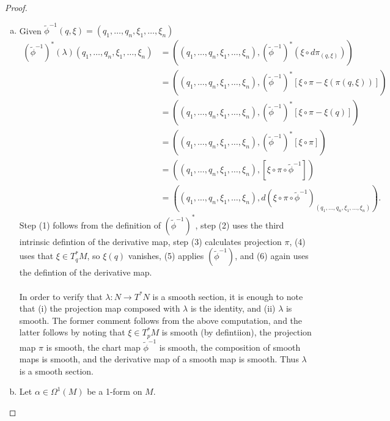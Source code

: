 \documentclass{article}
\begin{document}
\begin{proof} \text{}\\
  \begin{enumerate}[(a)]
    \item Given $\tilde{\phi}^{-1}(q, \xi) = (q_1, \hdots, q_n, \xi_1, \hdots, \xi_n)$
    \begin{align}
      (\tilde{\phi}^{-1})^*(\lambda)(q_1, \hdots, q_n, \xi_1, \hdots, \xi_n)
      &= ((q_1, \hdots, q_n, \xi_1, \hdots, \xi_n), (\tilde{\phi}^{-1})^*(\xi \circ d\pi_{(q, \xi)}))\\
      &= ((q_1, \hdots, q_n, \xi_1, \hdots, \xi_n), (\tilde{\phi}^{-1})^*[\xi \circ \pi - \xi(\pi(q, \xi))])\\
      &= ((q_1, \hdots, q_n, \xi_1, \hdots, \xi_n), (\tilde{\phi}^{-1})^*[\xi \circ \pi - \xi(q)]) \\
      &= ((q_1, \hdots, q_n, \xi_1, \hdots, \xi_n), (\tilde{\phi}^{-1})^*[\xi \circ \pi]) \\
      &= ((q_1, \hdots, q_n, \xi_1, \hdots, \xi_n), [\xi \circ \pi \circ \tilde{\phi}^{-1}]) \\
      &= ((q_1, \hdots, q_n, \xi_1, \hdots, \xi_n), d(\xi \circ \pi \circ \tilde{\phi}^{-1})_{(q_1, \hdots, q_n, \xi_1, \hdots, \xi_n)}).
    \end{align}
    Step (1) follows from the definition of $(\tilde{\phi}^{-1})^*$, step (2) uses the third
    intrinsic defintion of the derivative map, step (3) calculates projection $\pi$,
    (4) uses that $\xi \in T_q^*M$, so $\xi(q)$ vanishes, (5) applies $(\tilde{\phi}^{-1})$,
    and (6) again uses the defintion of the derivative map.\\
    \\
    In order to verify that $\lambda\colon N \rightarrow T^*N$ is a smooth section,
    it is enough to note that (i) the projection map composed with $\lambda$ is
    the identity, and (ii) $\lambda$ is smooth. The former comment follows from the
    above computation, and the latter follows by noting that $\xi \in T_p^*M$ is
    smooth (by defintiion), the projection map $\pi$ is smooth, the chart map
    $\tilde{\phi}^{-1}$ is smooth, the composition of
    smooth maps is smooth, and the derivative map of a smooth map is smooth.
    Thus $\lambda$ is a smooth section.
    \item
    Let $\alpha \in \Omega^1(M)$ be a 1-form on $M$.

\end{enumerate}
\end{proof}
\end{document}
